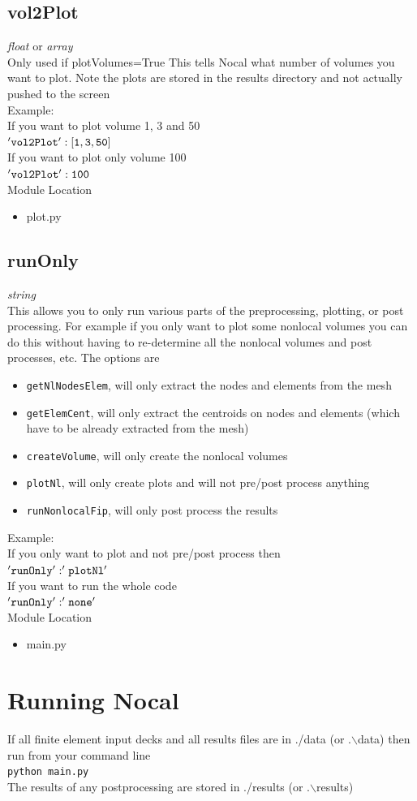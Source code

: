 \documentclass[11pt]{article}
\newcommand{\mainFileName}{main.py }
\begin{document}
\subsection{vol2Plot}
\emph{float} or \emph{array}  \\
Only used if plotVolumes=True
This tells Nocal what number of volumes you want to plot. Note the plots are stored in the results directory and not actually pushed to the screen \\
Example:\\
If you want to plot volume 1, 3 and 50 \\
{$\tt{'vol2Plot' : [1,3,50]}$}\\
If you want to plot only volume 100 \\
{$\tt{'vol2Plot' : 100}$}\\
Module Location\\
\begin{itemize}
  \item plot.py
\end{itemize}
\subsection{runOnly}
\emph{string}   \\
This allows you to only run various parts of the preprocessing, plotting, or post processing. For example if you only want to plot some nonlocal volumes you can do this without having to re-determine all the nonlocal volumes and post processes, etc.
The options are
\begin{itemize}
  \item {\tt{getNlNodesElem}}, will only extract the nodes and elements from the mesh
    \item {\tt{getElemCent}}, will only extract the centroids on nodes and elements (which have to be already extracted from the mesh)
    \item {\tt{createVolume}}, will only create the nonlocal volumes 
      \item {\tt{plotNl}}, will only create plots and will not pre/post process anything
      \item {\tt{runNonlocalFip}}, will only post process the results
\end{itemize}
Example:\\
If you only want to plot and not pre/post process then \\
{$\tt{'runOnly': 'plotNl'}$}\\
If you want to run the whole code \\
{$\tt{'runOnly': 'none'}$}\\
Module Location\\
\begin{itemize}
  \item main.py
\end{itemize}
\section{Running Nocal}
If all finite element input decks and all results files are in ./data (or .$\backslash$data) then run from your command line\\
{\tt{python \mainFileName}} \\
The results of any postprocessing are stored in ./results (or .$\backslash$results)
\end{document}
